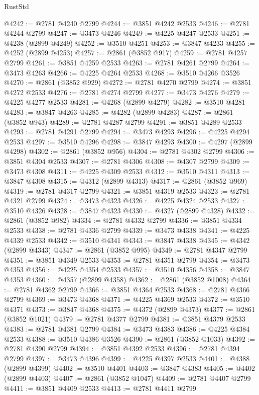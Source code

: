 \begin{lexlean}{RustStd}
\begin{coremodule}
@4242 := @2781 @4240 @2799
@4244 := @3851 @4242 @2533
@4246 := @2781 @4244 @2799
@4247 := @3473 @4246
@4249 := @4225 @4247 @2533
@4251 := @4238 (@2899 @4249)
@4252 := @3510 @4251
@4253 := @3847 @4233
@4255 := @4252 (@2899 @4253)
@4257 := @2861 (@3852 @917)
@4259 := @2781 @4257 @2799
@4261 := @3851 @4259 @2533
@4263 := @2781 @4261 @2799
@4264 := @3473 @4263
@4266 := @4225 @4264 @2533
@4268 := @3510 @4266 @3526
@4270 := @2861 (@3852 @929)
@4272 := @2781 @4270 @2799
@4274 := @3851 @4272 @2533
@4276 := @2781 @4274 @2799
@4277 := @3473 @4276
@4279 := @4225 @4277 @2533
@4281 := @4268 (@2899 @4279)
@4282 := @3510 @4281
@4283 := @3847 @4263
@4285 := @4282 (@2899 @4283)
@4287 := @2861 (@3852 @943)
@4289 := @2781 @4287 @2799
@4291 := @3851 @4289 @2533
@4293 := @2781 @4291 @2799
@4294 := @3473 @4293
@4296 := @4225 @4294 @2533
@4297 := @3510 @4296
@4298 := @3847 @4293
@4300 := @4297 (@2899 @4298)
@4302 := @2861 (@3852 @956)
@4304 := @2781 @4302 @2799
@4306 := @3851 @4304 @2533
@4307 := @2781 @4306
@4308 := @4307 @2799
@4309 := @3473 @4308
@4311 := @4225 @4309 @2533
@4312 := @3510 @4311
@4313 := @3847 @4308
@4315 := @4312 (@2899 @4313)
@4317 := @2861 (@3852 @969)
@4319 := @2781 @4317 @2799
@4321 := @3851 @4319 @2533
@4323 := @2781 @4321 @2799
@4324 := @3473 @4323
@4326 := @4225 @4324 @2533
@4327 := @3510 @4326
@4328 := @3847 @4323
@4330 := @4327 (@2899 @4328)
@4332 := @2861 (@3852 @982)
@4334 := @2781 @4332 @2799
@4336 := @3851 @4334 @2533
@4338 := @2781 @4336 @2799
@4339 := @3473 @4338
@4341 := @4225 @4339 @2533
@4342 := @3510 @4341
@4343 := @3847 @4338
@4345 := @4342 (@2899 @4343)
@4347 := @2861 (@3852 @995)
@4349 := @2781 @4347 @2799
@4351 := @3851 @4349 @2533
@4353 := @2781 @4351 @2799
@4354 := @3473 @4353
@4356 := @4225 @4354 @2533
@4357 := @3510 @4356
@4358 := @3847 @4353
@4360 := @4357 (@2899 @4358)
@4362 := @2861 (@3852 @1008)
@4364 := @2781 @4362 @2799
@4366 := @3851 @4364 @2533
@4368 := @2781 @4366 @2799
@4369 := @3473 @4368
@4371 := @4225 @4369 @2533
@4372 := @3510 @4371
@4373 := @3847 @4368
@4375 := @4372 (@2899 @4373)
@4377 := @2861 (@3852 @1021)
@4379 := @2781 @4377 @2799
@4381 := @3851 @4379 @2533
@4383 := @2781 @4381 @2799
@4384 := @3473 @4383
@4386 := @4225 @4384 @2533
@4388 := @3510 @4386 @3526
@4390 := @2861 (@3852 @1033)
@4392 := @2781 @4390 @2799
@4394 := @3851 @4392 @2533
@4396 := @2781 @4394 @2799
@4397 := @3473 @4396
@4399 := @4225 @4397 @2533
@4401 := @4388 (@2899 @4399)
@4402 := @3510 @4401
@4403 := @3847 @4383
@4405 := @4402 (@2899 @4403)
@4407 := @2861 (@3852 @1047)
@4409 := @2781 @4407 @2799
@4411 := @3851 @4409 @2533
@4413 := @2781 @4411 @2799

\end{coremodule}
\end{lexlean}
